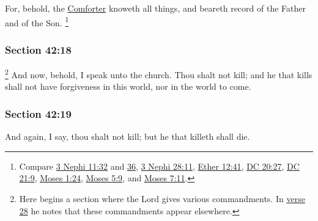 		For, behold, the \hyperref[COMFORTER]{Comforter} knoweth all things, and beareth record of the Father and of the Son.%
			\footnote{%
				Compare \hyperref[3NEPHI-11-32]{3 Nephi 11:32} and \hyperref[3NEPHI-11-36]{36}, \hyperref[3NEPHI-28-11]{3 Nephi 28:11}, \hyperref[ETHER-12-41]{Ether 12:41}, \hyperref[DC20-27]{DC 20:27}, \hyperref[DC21-9]{DC 21:9}, \hyperref[MOSES-1-24]{Moses 1:24}, \hyperref[MOSES-5-9]{Moses 5:9}, and \hyperref[MOSES-7-11]{Moses 7:11}.
				}


	\subsubsection{Section 42:18} %
		\label{DC42-18}

			\footnote{%
				Here begins a section where the Lord gives various commandments. In \hyperref[DC42-28]{verse 28} he notes that these commandments appear elsewhere.
				}%
		And now, behold, I speak unto the church.  Thou shalt not kill; and he that kills shall not have forgiveness in this world, nor in the world to come.


	\subsubsection{Section 42:19} %
		\label{DC42-19}

		And again, I say, thou shalt not kill; but he that killeth shall die.


